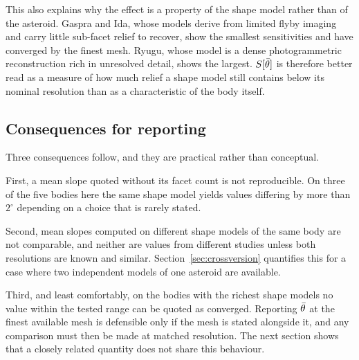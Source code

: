 This also explains why the effect is a property of the shape model rather than
of the asteroid. Gaspra and Ida, whose models derive from limited flyby imaging
and carry little sub-facet relief to recover, show the smallest sensitivities
and have converged by the finest mesh. Ryugu, whose model is a dense
photogrammetric reconstruction rich in unresolved detail, shows the largest.
$S[\bar{\theta}]$ is therefore better read as a measure of how much relief a shape
model still contains below its nominal resolution than as a characteristic of
the body itself.

\subsection{Consequences for reporting}
\label{sec:slopereport}

Three consequences follow, and they are practical rather than conceptual.

First, a mean slope quoted without its facet count is not reproducible. On three
of the five bodies here the same shape model yields values differing by more
than $2^{\circ}$ depending on a choice that is rarely stated.

Second, mean slopes computed on different shape models of the same body are not
comparable, and neither are values from different studies unless both
resolutions are known and similar. Section~\ref{sec:crossversion} quantifies
this for a case where two independent models of one asteroid are available.

Third, and least comfortably, on the bodies with the richest shape models no
value within the tested range can be quoted as converged. Reporting $\bar{\theta}$ at the finest available
mesh is defensible only if the mesh is stated alongside it, and any comparison
must then be made at matched resolution. The next section shows that a closely
related quantity does not share this behaviour.
